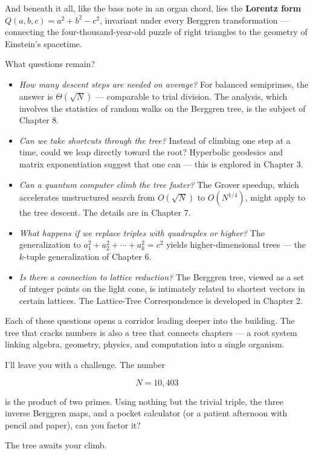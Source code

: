 And beneath it all, like the bass note in an organ chord, lies the \textbf{Lorentz form} \(Q(a,b,c) = a^2 + b^2 - c^2\), invariant under every Berggren transformation --- connecting the four-thousand-year-old puzzle of right triangles to the geometry of Einstein's spacetime.

What questions remain?

\begin{itemize}
\item
  \emph{How many descent steps are needed on average?} For balanced semiprimes, the answer is \(\Theta(\sqrt{N})\) --- comparable to trial division. The analysis, which involves the statistics of random walks on the Berggren tree, is the subject of Chapter 8.
\item
  \emph{Can we take shortcuts through the tree?} Instead of climbing one step at a time, could we leap directly toward the root? Hyperbolic geodesics and matrix exponentiation suggest that one can --- this is explored in Chapter 3.
\item
  \emph{Can a quantum computer climb the tree faster?} The Grover speedup, which accelerates unstructured search from \(O(\sqrt{N})\) to \(O(N^{1/4})\), might apply to the tree descent. The details are in Chapter 7.
\item
  \emph{What happens if we replace triples with quadruples or higher?} The generalization to \(a_1^2 + a_2^2 + \cdots + a_k^2 = c^2\) yields higher-dimensional trees --- the \(k\)-tuple generalization of Chapter 6.
\item
  \emph{Is there a connection to lattice reduction?} The Berggren tree, viewed as a set of integer points on the light cone, is intimately related to shortest vectors in certain lattices. The Lattice-Tree Correspondence is developed in Chapter 2.
\end{itemize}

Each of these questions opens a corridor leading deeper into the building. The tree that cracks numbers is also a tree that connects chapters --- a root system linking algebra, geometry, physics, and computation into a single organism.

I'll leave you with a challenge. The number

\[N = 10{,}403\]

is the product of two primes. Using nothing but the trivial triple, the three inverse Berggren maps, and a pocket calculator (or a patient afternoon with pencil and paper), can you factor it?

The tree awaits your climb.


